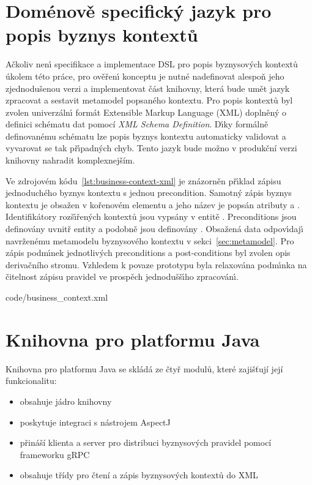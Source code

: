 \section{Doménově specifick\'y jazyk pro popis byznys kontextů}\label{sec:dsl-impl}

Ačkoliv nen\'{\i} specifikace a implementace \gls{DSL} pro popis byznysových kontextů
úkolem této práce, pro ověřen\'{\i} konceptu je nutné nadefinovat alespoň jeho zjednodušenou
verzi a implementovat část knihovny, která bude umět jazyk zpracovat a sestavit metamodel popsaného
kontextu. Pro popis kontextů byl zvolen univerzáln\'{\i} formát Extensible
Markup Language (\gls{XML}) doplněný o definici schématu dat pomocí \textit{XML Schema Definition}.
D\'{\i}ky formálně definovanému schématu lze popis byznys kontextu automaticky validovat a vyvarovat se tak
př\'{\i}padn\'ych chyb. Tento jazyk bude možno v produkční verzi knihovny nahradit komplexnejším.

Ve zdrojovém kódu~\ref{lst:business-context-xml} je znázorněn
př\'{\i}klad zápisu jednoduchého byznys kontextu s jednou precondition.
Samotn\'y zápis byznys kontextu je obsažen v kořenovém elementu
 a jeho název je popsán atributy
 a . Identifikátory rozš\'{\i}řených kontextů jsou
vypsány v entitě . Preconditions jsou
definovány uvnitř entity  a podobně
jsou definovány . Obsažená data odpov\'{\i}daj\'{\i}
navrženému metamodelu byznysového kontextu v sekci~\ref{sec:metamodel}.
Pro zápis podm\'{\i}nek jednotliv\'ych preconditions a post-conditions byl zvolen
opis derivačního stromu. Vzhledem k povaze prototypu byla relaxována podm\'{\i}nka
na čitelnost zápisu pravidel ve prospěch jednodušš\'{\i}ho zpracován\'{\i}.


{code/business_context.xml}

\section{Knihovna pro platformu Java}

Knihovna pro platformu Java se skládá ze čtyř modulů, které zajišťují
její funkcionalitu:

\begin{itemize}
    \item {} obsahuje jádro knihovny
    \item {} poskytuje integraci s nástrojem AspectJ
    \item {} přináší klienta a server pro distribuci byznysových pravidel pomocí frameworku gRPC
    \item {} obsahuje třídy pro čtení a zápis byznysových kontextů do \gls{XML}
\end{itemize}

